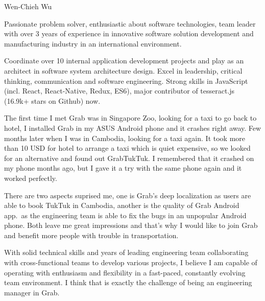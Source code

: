 \documentclass[11pt, a4paper]{awesome-cv}
\begin{document}
\makecvheader[R]

\makecvfooter
  {}
  {Wen-Chieh Wu}
  {}

\makelettertitle

\begin{cvletter}

Passionate problem solver, enthusiastic about software technologies, team leader with over 3 years of experience in innovative software solution development and manufacturing industry in an international environment.

Coordinate over 10 internal application development projects and play as an architect in software system architecture design. Excel in leadership, critical thinking, communication and software engineering. Strong skills in JavaScript (incl. React, React-Native, Redux, ES6), major contributor of tesseract.js (16.9k+ stars on Github) now.

The first time I met Grab was in Singapore Zoo, looking for a taxi to go back to hotel, I installed Grab in my ASUS Android phone and it crashes right away. Few months later when I was in Cambodia, looking for a taxi again. It took more than 10 USD for hotel to arrange a taxi which is quiet expensive, so we looked for an alternative and found out GrabTukTuk. I remembered that it crashed on my phone months ago, but I gave it a try with the same phone again and it worked perfectly.

There are two aspects suprised me, one is Grab's deep localization as users are able to book TukTuk in Cambodia, another is the quality of Grab Android app.\ as the engineering team is able to fix the bugs in an unpopular Android phone. Both leave me great impressions and that's why I would like to join Grab and benefit more people with trouble in transportation.

With solid technical skills and years of leading engineering team collaborating with cross-functional teams to develop various projects, I believe I am capable of operating with enthusiasm and flexibility in a fast-paced, constantly evolving team environment. I think that is exactly the challenge of being an engineering manager in Grab.

\end{cvletter}


\makeletterclosing
\end{document}
